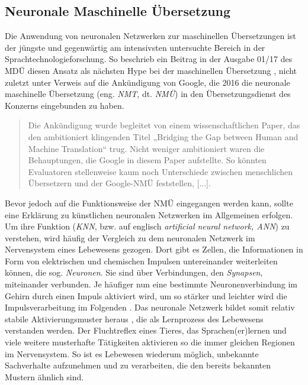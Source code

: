 
\subsection{Neuronale Maschinelle Übersetzung}

\label{K3:subsec:NMT}


\begin{sloppypar}
Die Anwendung von neuronalen Netzwerken zur maschinellen Übersetzungen ist der jüngste und gegenwärtig am intensivsten untersuchte Bereich in der Sprachtechnologieforschung. So beschrieb ein Beitrag in der Ausgabe 01/17 des MDÜ diesen Ansatz als nächsten \glqq Hype bei der maschinellen Übersetzung\grqq{} \citep[38]{kruger_von_2017}, nicht zuletzt unter Verweis auf die Ankündigung von Google, die 2016 die neuronale maschinelle Übersetzung (eng. \emph{NMT}, dt. \emph{NMÜ}) in den Übersetzungsdienst des Konzerns eingebunden zu haben.\end{sloppypar}

\begin{quote}

Die Ankündigung wurde begleitet von einem wissenschaftlichen Paper, das den ambitioniert klingenden Titel „Bridging the Gap between Human and Machine Translation“ trug. Nicht weniger ambitioniert waren die Behauptungen, die Google in diesem Paper aufstellte. So könnten Evaluatoren stellenweise kaum noch Unterschiede zwischen menschlichen Übersetzern und der Google-NMÜ feststellen, [...]. \citep[38]{kruger_von_2017}

\end{quote}

Bevor jedoch auf die Funktionsweise der NMÜ eingegangen werden kann, sollte eine Erklärung zu künstlichen neuronalen Netzwerken im Allgemeinen erfolgen. Um ihre Funktion (\emph{KNN}, bzw. auf englisch \emph{artificial neural network, ANN}) zu verstehen, wird häufig der Vergleich zu dem neuronalen Netzwerk im Nervensystem eines Lebewesens gezogen. Dort gibt es Zellen, die Informationen in Form von elektrischen und chemischen Impulsen untereinander weiterleiten können, die sog. \emph{Neuronen}. Sie sind über Verbindungen, den \emph{Synapsen}, miteinander verbunden. Je häufiger nun eine bestimmte Neuronenverbindung im Gehirn durch einen Impuls aktiviert wird, um so stärker und leichter wird die Impulsverarbeitung im Folgenden \citep[19\psq]{kriesel_kleiner_2005}. Das neuronale Netzwerk bildet somit \glqq relativ stabile Aktivierungsmuster heraus\grqq{} \citep[38]{kruger_von_2017}, die als Lernprozess des Lebewesens verstanden werden. Der Fluchtreflex eines Tieres, das Sprachen(er)lernen und viele weitere musterhafte Tätigkeiten aktivieren so die immer gleichen Regionen im Nervensystem. So ist es Lebewesen wiederum möglich, unbekannte Sachverhalte aufzunehmen und zu verarbeiten, die den bereits bekannten Mustern ähnlich sind.

